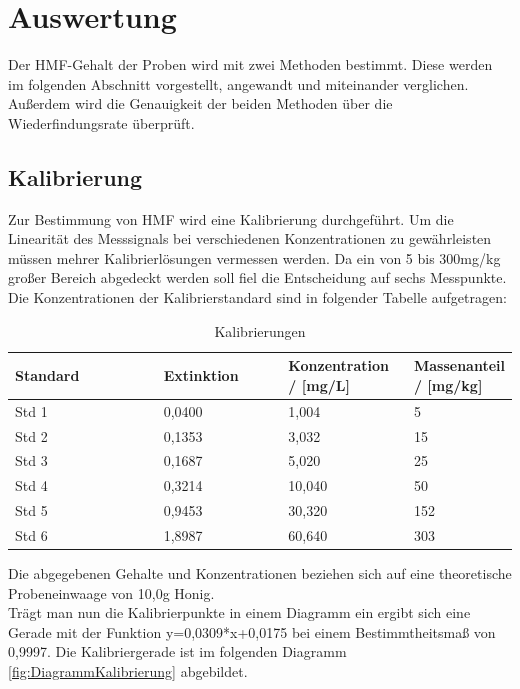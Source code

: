 \chapter{Auswertung}
Der HMF-Gehalt der Proben wird mit zwei Methoden bestimmt. Diese werden im folgenden Abschnitt vorgestellt, angewandt und miteinander verglichen. Außerdem wird die Genauigkeit der beiden Methoden über die Wiederfindungsrate überprüft.
\section{Kalibrierung}
Zur Bestimmung von HMF wird eine Kalibrierung durchgeführt. Um die Linearität des Messsignals bei verschiedenen Konzentrationen zu gewährleisten müssen mehrer Kalibrierlösungen vermessen werden. Da ein von 5 bis 300mg/kg großer Bereich abgedeckt werden soll fiel die Entscheidung auf sechs Messpunkte. Die Konzentrationen der Kalibrierstandard sind in folgender Tabelle aufgetragen:

\begin{table}[htbp]
	\centering
		\begin{tabular}{p{0.30\linewidth}|p{0.25\linewidth}|p{0.25\linewidth}|p{0.2\linewidth}}
			Standard & Extinktion & Konzentration / [mg/L] &  Massenanteil / [mg/kg]\\
			\hline
			Std 1 & 0,0400 & 1,004 & 5\\
			\hline
			Std 2 & 0,1353 & 3,032 & 15\\
			\hline
			Std 3 & 0,1687 & 5,020 & 25\\
			\hline
			Std 4 & 0,3214 & 10,040 & 50\\
			\hline
			Std 5 & 0,9453 & 30,320 & 152\\
			\hline
			Std 6 & 1,8987 & 60,640 & 303
		\end{tabular}
	\caption{Kalibrierungen}
	\label{tab:Kalibrierungen}
\end{table}

Die abgegebenen Gehalte und Konzentrationen beziehen sich auf eine theoretische Probeneinwaage von 10,0g Honig.\\
Trägt man nun die Kalibrierpunkte in einem Diagramm ein ergibt sich eine Gerade mit der Funktion y=0,0309*x+0,0175 bei einem Bestimmtheitsmaß von 0,9997. Die Kalibriergerade ist im folgenden Diagramm \ref{fig:DiagrammKalibrierung} abgebildet.

